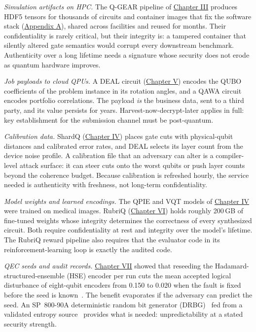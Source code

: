 \documentclass{report}
\theoremstyle{plain}
\theoremstyle{definition}
\theoremstyle{remark}
\begin{document}
\emph{Simulation artifacts on HPC.} The Q-GEAR pipeline of \hyperref[ch:qgear]{Chapter III} produces HDF5 tensors for thousands of circuits and container images that fix the software stack (\hyperref[app:qgear]{Appendix A}), shared across facilities and reused for months. Their confidentiality is rarely critical, but their integrity is: a tampered container that silently altered gate semantics would corrupt every downstream benchmark. Authenticity over a long lifetime needs a signature whose security does not erode as quantum hardware improves.

\emph{Job payloads to cloud QPUs.} A DEAL circuit (\hyperref[ch:nisq]{Chapter V}) encodes the QUBO coefficients of the problem instance in its rotation angles, and a QAWA circuit encodes portfolio correlations. The payload \emph{is} the business data, sent to a third party, and its value persists for years. Harvest-now-decrypt-later applies in full: key establishment for the submission channel must be post-quantum.

\emph{Calibration data.} ShardQ (\hyperref[ch:qml]{Chapter IV}) places gate cuts with physical-qubit distances and calibrated error rates, and DEAL selects its layer count from the device noise profile. A calibration file that an adversary can alter is a compiler-level attack surface: it can steer cuts onto the worst qubits or push layer counts beyond the coherence budget. Because calibration is refreshed hourly, the service needed is authenticity with freshness, not long-term confidentiality.

\emph{Model weights and learned encodings.} The QPIE and VQT models of \hyperref[ch:qml]{Chapter IV} were trained on medical images. RubriQ (\hyperref[ch:synthesis]{Chapter VI}) holds roughly 200 GB of fine-tuned weights whose integrity determines the correctness of every synthesized circuit. Both require confidentiality at rest and integrity over the model's lifetime. The RubriQ reward pipeline also requires that the evaluator code in its reinforcement-learning loop is exactly the audited code.

\emph{QEC seeds and audit records.} \hyperref[ch:qec]{Chapter VII} showed that reseeding the Hadamard-structured-ensemble (HSE) encoder per run cuts the mean accepted logical disturbance of eight-qubit encoders from 0.150 to 0.020 when the fault is fixed before the seed is known~\cite{guo2026qecaudit}. The benefit evaporates if the adversary can predict the seed. An SP~800-90A deterministic random bit generator (DRBG)~\cite{nist2015sp80090a} fed from a validated entropy source~\cite{nist2018sp80090b} provides what is needed: unpredictability at a stated security strength.
\end{document}
